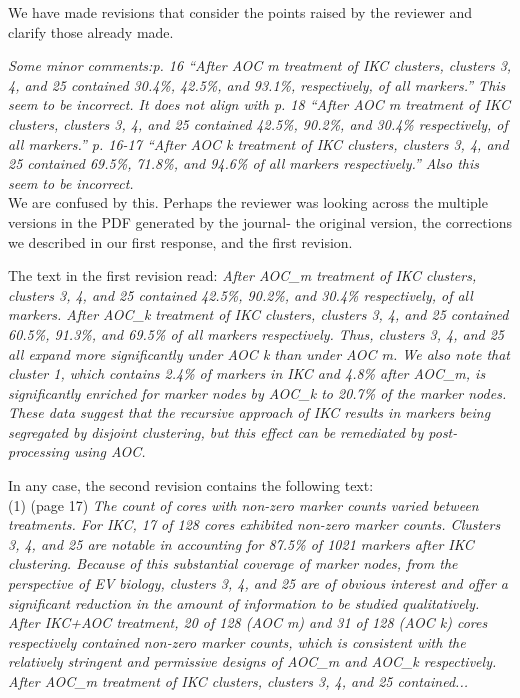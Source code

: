 \documentclass[11pt, oneside]{article}   	%
\begin{document}
 \vspace{2 mm} 
 We have made revisions that consider the points raised by the reviewer and clarify those already made.

\vspace{2 mm} 
 \emph{Some minor comments:p. 16 “After AOC m treatment of IKC clusters, clusters 3, 4, and 25 contained 30.4\%, 42.5\%, and 93.1\%, respectively, of all markers.” This seem to be incorrect. It does not align with p. 18 “After AOC m treatment of IKC clusters, clusters 3, 4, and 25 contained 42.5\%, 90.2\%, and 30.4\% respectively, of all markers.” p. 16-17 “After AOC k treatment of IKC clusters, clusters 3, 4, and 25 contained 69.5\%, 71.8\%, and 94.6\% of all markers respectively.” Also this seem to be incorrect.} \\

We are confused by this. Perhaps the reviewer was looking across the multiple versions in the PDF generated by the journal- the original version, the corrections we described in our first response, and the first revision. 

\vspace{2 mm} 
The text in the first revision read: \emph{After AOC\_m treatment of IKC clusters, clusters 3, 4, and 25 contained 42.5\%, 90.2\%, and 30.4\% respectively, of all markers. After AOC\_k treatment of IKC clusters, clusters 3, 4, and 25 contained 60.5\%, 91.3\%, and 69.5\% of all markers respectively. Thus, clusters 3, 4, and 25 all expand more significantly under AOC k than under AOC m. We also note that cluster 1, which contains 2.4\% of markers in IKC and 4.8\% after AOC\_m, is significantly enriched for marker nodes by AOC\_k to 20.7\% of the marker nodes. These data suggest that the recursive approach of IKC results in markers being segregated by disjoint clustering, but this effect can be remediated by post-processing using AOC.}

\vspace{2 mm} 
In any case, the second revision contains the following text: \\

(1)  (page 17)   \emph{The count of cores with non-zero marker counts varied between treatments. For IKC, 17 of 128 cores exhibited non-zero marker counts. Clusters 3, 4, and 25 are notable in accounting for 87.5\% of 1021 markers after IKC clustering. Because of this substantial coverage of marker nodes, from the perspective of EV biology, clusters 3, 4, and 25 are of obvious interest and offer a significant reduction in the amount of information to be studied qualitatively.
After IKC+AOC treatment, 20 of 128 (AOC m) and 31 of 128 (AOC k) cores respectively contained non-zero marker counts, which is consistent with the relatively stringent and permissive designs of AOC\_m and AOC\_k respectively. After AOC\_m treatment of IKC clusters, clusters 3, 4, and 25 contained...}\\
\end{document}
